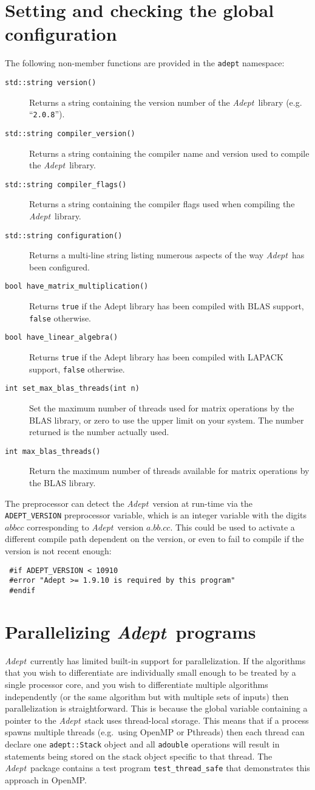 \documentclass[a4,oneside]{book}
\def\codesize{\small}
\def\Adept{\emph{Adept}}
\def\code#1{{\codesize\texttt{#1}}}
\def\citem#1{\item[{\codesize\texttt{#1}}]}
\begin{document}
\section{Setting and checking the global configuration}
\label{sec:settings}
\noindent The following non-member functions are provided in the
\code{adept} namespace:
\begin{description}
\citem{std::string version()} Returns a string containing the version
number of the \Adept\ library (e.g. ``\code{2.0.8}'').
\citem{std::string compiler\_version()} Returns a string containing
the compiler name and version used to compile the \Adept\ library.
\citem{std::string compiler\_flags()} Returns a string containing the
compiler flags used when compiling the \Adept\ library.
\citem{std::string configuration()} Returns a multi-line string
listing numerous aspects of the way \Adept\ has been configured.
\citem{bool have\_matrix\_multiplication()} Returns \code{true} if the
Adept library has been compiled with BLAS support, \code{false}
otherwise.
\citem{bool have\_linear\_algebra()} Returns \code{true} if the
Adept library has been compiled with LAPACK support, \code{false}
otherwise.
\citem{int set\_max\_blas\_threads(int n)} Set the maximum number of
threads used for matrix operations by the BLAS library, or zero to use
the upper limit on your system. The number returned is the number
actually used.  
\citem{int max\_blas\_threads()} Return the maximum number of
threads available for matrix operations by the BLAS library.
%
\end{description}

The preprocessor can detect the \Adept\ version at run-time via the
\code{ADEPT\_VERSION} preprocessor variable, which is an integer
variable with the digits $abbcc$ corresponding to \Adept\ version
$a.bb.cc$. This could be used to activate a different compile path
dependent on the version, or even to fail to compile if the version is
not recent enough:
\begin{lstlisting}
 #if ADEPT_VERSION < 10910
 #error "Adept >= 1.9.10 is required by this program"
 #endif
\end{lstlisting}

\section{Parallelizing \Adept\ programs}
\Adept\ currently has limited built-in support for parallelization. If
the algorithms that you wish to differentiate are individually small
enough to be treated by a single processor core, and you wish to
differentiate multiple algorithms independently (or the same algorithm
but with multiple sets of inputs) then parallelization is
straightforward. This is because the global variable containing a
pointer to the \Adept\ stack uses thread-local storage.  This means
that if a process spawns multiple threads (e.g.\ using OpenMP or
Pthreads) then each thread can declare one \code{adept::Stack} object
and all \code{adouble} operations will result in statements being
stored on the stack object specific to that thread.  The
\Adept\ package contains a test program \code{test\_thread\_safe} that
demonstrates this approach in OpenMP.
\end{document}
